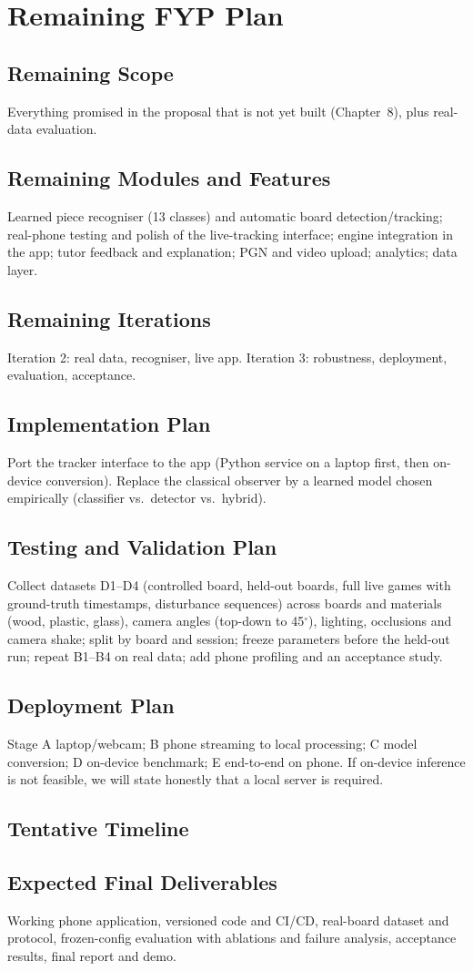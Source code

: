 \chapter{Remaining FYP Plan}
\section{Remaining Scope}
Everything promised in the proposal that is not yet built (Chapter~8), plus real-data evaluation.
\section{Remaining Modules and Features}
Learned piece recogniser (13 classes) and automatic board detection/tracking; real-phone testing and polish of the live-tracking interface; engine integration in the app; tutor feedback and explanation; PGN and video upload; analytics; data layer.
\section{Remaining Iterations}
Iteration 2: real data, recogniser, live app. Iteration 3: robustness, deployment, evaluation, acceptance.
\section{Implementation Plan}
Port the tracker interface to the app (Python service on a laptop first, then on-device conversion). Replace the
classical observer by a learned model chosen empirically (classifier vs.\ detector vs.\ hybrid).
\section{Testing and Validation Plan}\label{sec:valplan}
Collect datasets D1--D4 (controlled board, held-out boards, full live games with ground-truth timestamps,
disturbance sequences) across boards and materials (wood, plastic, glass), camera angles (top-down to 45$^\circ$),
lighting, occlusions and camera shake; split by board and session; freeze parameters before the held-out run;
repeat B1--B4 on real data; add phone profiling and an acceptance study.
\section{Deployment Plan}
Stage A laptop/webcam; B phone streaming to local processing; C model conversion; D on-device benchmark;
E end-to-end on phone. If on-device inference is not feasible, we will state honestly that a local server is required.
\section{Tentative Timeline}
\section{Expected Final Deliverables}
Working phone application, versioned code and CI/CD, real-board dataset and protocol, frozen-config evaluation
with ablations and failure analysis, acceptance results, final report and demo.
